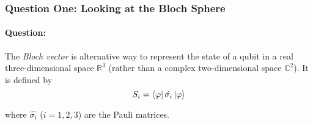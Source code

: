 \documentclass[reprint, amsmath,amssymb, aps]{revtex4-2}
\begin{document}
            \subsubsection{Question One: Looking at the Bloch Sphere}
                \paragraph{Question:}
                
                The \textit{Bloch vector} is alternative way to represent the state of a qubit in a real three-dimensional space $\mathbb{R}^3$ (rather than a complex two-dimensional space $\mathbb{C}^2$). It is defined by 
                \begin{equation*}
                    S_i = \bra{\varphi}\hat{\sigma_i}\ket{\varphi}
                \end{equation*}

                where $\hat{\sigma_i}$ ($i=1,2,3$) are the Pauli matrices.
                
\end{document}
